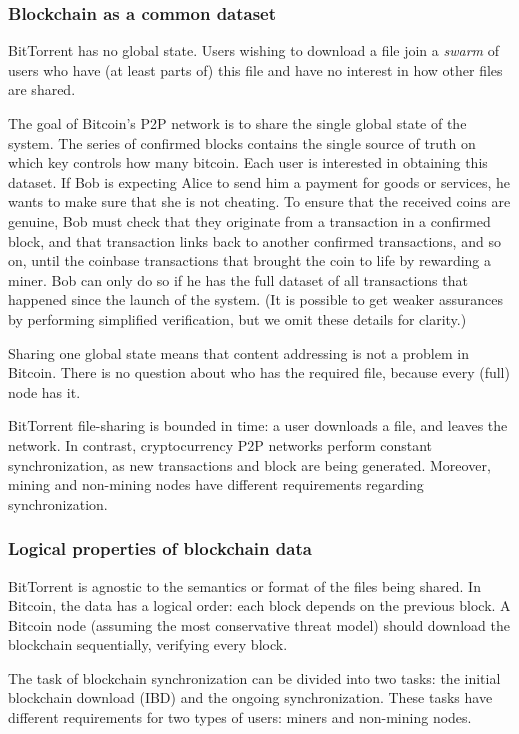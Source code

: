 \subsubsection{Blockchain as a common dataset}

BitTorrent has no global state.
Users wishing to download a file join a \textit{swarm} of users who have (at least parts of) this file and have no interest in how other files are shared.

The goal of Bitcoin's P2P network is to share the single global state of the system.
The series of confirmed blocks contains the single source of truth on which key controls how many bitcoin.
Each user is interested in obtaining this dataset.
If Bob is expecting Alice to send him a payment for goods or services, he wants to make sure that she is not cheating.
To ensure that the received coins are genuine, Bob must check that they originate from a transaction in a confirmed block, and that transaction links back to another confirmed transactions, and so on, until the coinbase transactions that brought the coin to life by rewarding a miner.
Bob can only do so if he has the full dataset of all transactions that happened since the launch of the system.
(It is possible to get weaker assurances by performing simplified verification, but we omit these details for clarity.)

Sharing one global state means that content addressing is not a problem in Bitcoin.
There is no question about who has the required file, because every (full) node has it.

BitTorrent file-sharing is bounded in time: a user downloads a file, and leaves the network.
In contrast, cryptocurrency P2P networks perform constant synchronization, as new transactions and block are being generated.
Moreover, mining and non-mining nodes have different requirements regarding synchronization.



\subsubsection{Logical properties of blockchain data}

BitTorrent is agnostic to the semantics or format of the files being shared.
In Bitcoin, the data has a logical order: each block depends on the previous block.
A Bitcoin node (assuming the most conservative threat model) should download the blockchain sequentially, verifying every block.

The task of blockchain synchronization can be divided into two tasks: the initial blockchain download (IBD) and the ongoing synchronization.
These tasks have different requirements for two types of users: miners and non-mining nodes.

